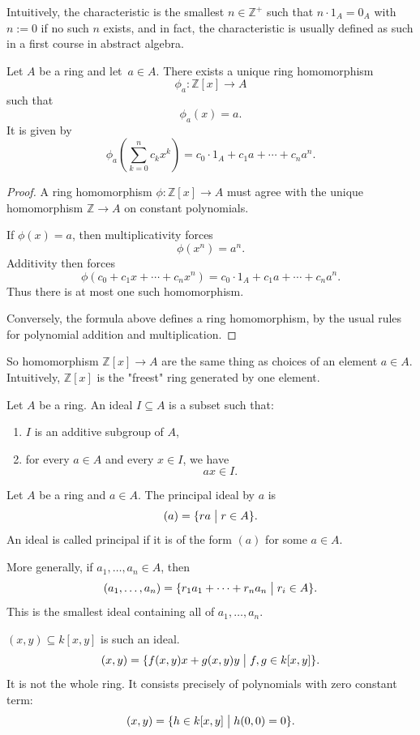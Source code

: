 \documentclass[11pt]{article}
\begin{document}
Intuitively, the characteristic is the smallest 
$n \in \mathbb Z^+$ such that $n \cdot 1_A = 0_A$ with 
$n := 0$ if no such $n$ exists, and in fact, the characteristic 
is usually defined as such in a first course in abstract 
algebra. 

\begin{prop}
    Let $A$ be a ring and let $a \in A$. There exists 
    a unique ring homomorphism 
    \[
        \phi_a : \mathbb Z[x] \to A
    \]
    such that 
    \[
        \phi_a(x) = a. 
    \]
    It is given by 
    \[
        \phi_a\left(\sum_{k=0}^n c_kx^k\right) = c_0 \cdot 1_A 
        + c_1 a + \cdots + c_n a^n.
    \]
\end{prop}
\begin{proof}
    A ring homomorphism $\phi : \mathbb Z[x] \to A$ must agree 
    with the unique homomorphism $\mathbb Z \to A$ on constant 
    polynomials. 

    If $\phi(x) = a$, then multiplicativity forces 
    \[
        \phi(x^n) = a^n. 
    \]
    Additivity then forces 
    \[
        \phi(c_0 + c_1x + \cdots + c_nx^n) 
        = c_0 \cdot 1_A + c_1a + \cdots + c_na^n. 
    \]
    Thus there is at most one such homomorphism. 

    Conversely, the formula above defines a ring homomorphism, by 
        the usual rules for polynomial addition and multiplication.
\end{proof}
So homomorphism $\mathbb Z[x] \to A$ are the same thing as 
choices of an element $a \in A$. Intuitively, $\mathbb Z[x]$ is 
the "freest" ring generated by one element. 

\begin{defn}[Ideal]
    Let $A$ be a ring. An ideal $I \subseteq A$ is a subset 
    such that: 
    \begin{enumerate}
        \item $I$ is an additive subgroup of $A$, 
        \item for every $a \in A$ and every $x \in I$, we have 
            \[
                ax \in I. 
            \]
    \end{enumerate}
\end{defn}

\begin{defn}
    Let $A$ be a ring and $a \in A$. The principal ideal 
    by $a$ is 
    \[
        (a) = \{ra \bigm| r \in A\}. 
    \]
    An ideal is called principal if it is of the form 
    $(a)$ for some $a \in A$.
\end{defn}
More generally, if $a_1, \ldots, a_n \in A$, then 
\[
    (a_1,\ldots,a_n) = 
    \{r_1a_1 + \cdots + r_na_n \bigm| r_i \in A\}.
\]
This is the smallest ideal containing all of $a_1,\ldots,a_n$. 
\begin{ex}
    $(x,y) \subseteq k[x,y]$ is such an ideal. 
    \[
        (x,y) = 
        \{f(x,y)x + g(x,y)y \bigm| f,g \in k[x,y]\}. 
    \]
    It is not the whole ring. It consists precisely of 
    polynomials with zero constant term: 
    \[
        (x,y) = \{h \in k[x,y] \bigm| h(0,0) = 0\}.
    \]
\end{ex}
\end{document}
